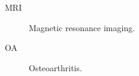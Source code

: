 
\begin{description}
  \item[MRI] Magnetic resonance imaging.
  \item[OA] Osteoarthritis.
\end{description}

